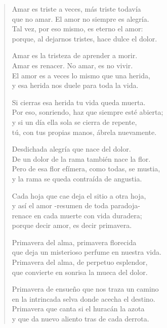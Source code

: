 \documentclass[11pt, portrait, twoside, notitlepage, openright]{book}
\begin{document}
\begin{verse}
Amar es triste a veces, más triste todavía\\
que no amar. El amor no siempre es alegría.\\
Tal vez, por eso mismo, es eterno el amor:\\
porque, al dejarnos tristes, hace dulce el dolor.
\newline

Amar es la tristeza de aprender a morir.\\
Amar es renacer. No amar, es no vivir.\\
El amor es a veces lo mismo que una herida,\\
y esa herida nos duele para toda la vida.
\newline

Si cierras esa herida tu vida queda muerta.\\
Por eso, sonriendo, haz que siempre esté abierta;\\
y si un día ella sola se cierra de repente,\\
tú, con tus propias manos, ábrela nuevamente.
\newline

Desdichada alegría que nace del dolor.\\
De un dolor de la rama también nace la flor.\\
Pero de esa flor efímera, como todas, se mustia,\\
y la rama se queda contraída de angustia.
\newpage

Cada hoja que cae deja el sitio a otra hoja,\\
y así el amor -resumen de toda paradoja-\\
renace en cada muerte con vida duradera;\\
porque decir amor, es decir primavera.
\newline

Primavera del alma, primavera florecida\\
que deja un misterioso perfume en nuestra vida.\\
Primavera del alma, de perpetuo esplendor,\\
que convierte en sonrisa la mueca del dolor.
\newline

Primavera de ensueño que nos traza un camino\\
en la intrincada selva donde acecha el destino.\\
Primavera que canta si el huracán la azota\\
y que da nuevo aliento tras de cada derrota.
\newline


\end{verse}
\end{document}
